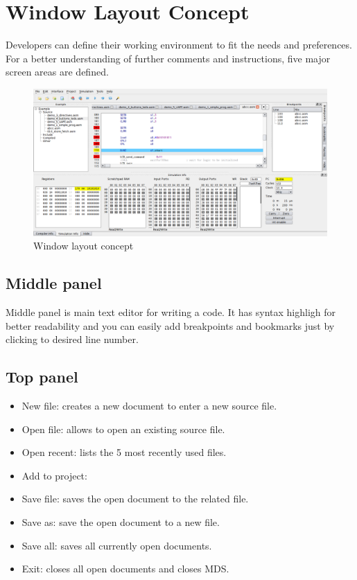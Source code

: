 \section{Window Layout Concept}
    Developers can define their working environment to fit the needs and preferences. For a better understanding of further comments and instructions, five major screen areas are defined. %


   \begin{figure}[h]
        \centering
        \includegraphics[width=\textwidth]{img/Main_window.png}
        \caption{Window layout concept}
    \end{figure}

\subsection{Middle panel}
    Middle panel is main text editor for writing a code. It has syntax highligh for better readability and you can easily add breakpoints and bookmarks just by clicking to desired line number.

\subsection{Top panel}
    \begin{itemize}
        \item New file: creates a new document to enter a new source file.
        \item Open file: allows to open an existing source file.
        \item Open recent: lists the 5 most recently used files.
        \item Add to project:
        \item Save file: saves the open document to the related file.
        \item Save as: save the open document to a new file.
        \item Save all: saves all currently open documents.
        \item Exit: closes all open documents and closes MDS.
    \end{itemize}

